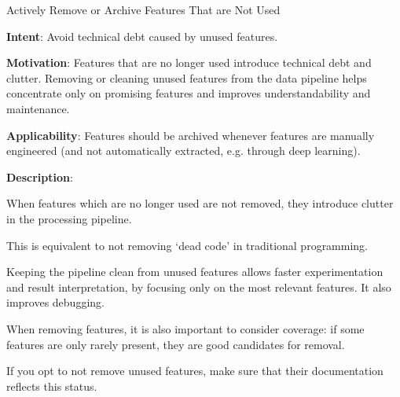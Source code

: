   
  \begin{frame}[plain]{ Actively Remove or Archive Features That are Not Used
 }

  \textbf{Intent}: Avoid technical debt caused by unused features. 
 

  \textbf{Motivation}: Features that are no longer used introduce technical debt and clutter. Removing or cleaning unused features from the data pipeline helps concentrate only on promising features and improves understandability and maintenance.  
 

  \textbf{Applicability}: Features should be archived whenever features are manually engineered (and not automatically extracted, e.g. through deep learning).
 

  \textbf{Description}: 

When features which are no longer used are not removed, they introduce clutter in the processing pipeline.


This is equivalent to not removing `dead code' in traditional programming.


Keeping the pipeline clean from unused features allows faster experimentation and result interpretation, by focusing only on the most relevant features.
It also improves debugging.


When removing features, it is also important to consider coverage: if some features are only rarely present, they are good candidates for removal.


If you opt to not remove unused features, make sure that their documentation reflects this status.


 


  \end{frame}

